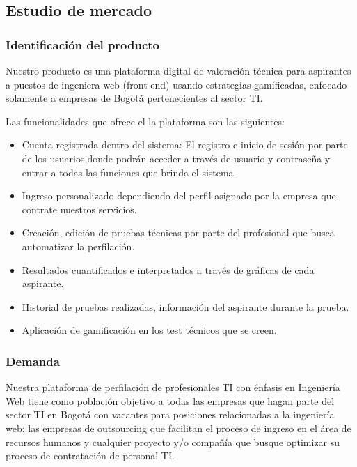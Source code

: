 \subsection{Estudio de mercado}

\subsubsection*{Identificación del producto}

Nuestro producto es una plataforma digital de valoración técnica para aspirantes a puestos de ingeniera web (front-end) usando estrategias gamificadas, enfocado solamente a empresas de Bogotá pertenecientes al sector TI. 

Las funcionalidades que ofrece el la plataforma son las siguientes:

\begin{itemize}

    \item Cuenta registrada dentro del sistema: El registro e inicio de sesión por parte de los usuarios,donde podrán acceder a través de usuario y contraseña y entrar a todas las funciones que brinda el sistema.
    
    \item Ingreso personalizado dependiendo del perfil asignado por la empresa que contrate nuestros servicios.
    
    \item Creación, edición de pruebas técnicas por parte del profesional que busca automatizar la perfilación.
    
    \item Resultados cuantificados e interpretados a través de gráficas de cada aspirante.
    
    \item Historial de pruebas realizadas, información del aspirante durante la prueba.
    
    \item Aplicación de gamificación en los test técnicos que se creen.
\end{itemize}

\subsubsection*{Demanda}

Nuestra plataforma de perfilación de profesionales TI con énfasis en Ingeniería Web tiene como población objetivo a todas las empresas que hagan parte del sector TI en Bogotá con vacantes para posiciones relacionadas a la ingeniería web; las empresas de outsourcing que facilitan el proceso de ingreso en el área de recursos humanos y cualquier proyecto y/o compañía que busque optimizar su proceso de contratación de personal TI.

